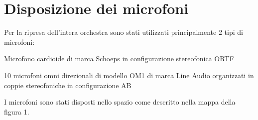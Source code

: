 \newcommand{\mylanguages}{italian} %
\newcommand{\mytitle}{Totalità sonora: il corpo dell'orchestra}
\newcommand{\mysubtitle}{Per ascoltare l'organismo sonoro orchestrale nel suo complesso e nei singoli dettagli}
\newcommand{\authorone}{Giancarlo Bottalico}
\newcommand{\institutione}{Conservatorio di musica "N. Piccinni", Bari}
\newcommand{\emailone}{giancarlobottalico@gmail.com}


\maketitle
\thispagestyle{empty}
\section*{Disposizione dei microfoni}
Per la ripresa dell'intera orchestra sono stati utilizzati principalmente 2 tipi di microfoni:
\begin{compactitem} 
\item Microfono cardioide di marca Schoeps in configurazione stereofonica ORTF
\item 10 microfoni omni direzionali di modello OM1 di marca Line Audio organizzati in coppie stereofoniche in configurazione AB
\end{compactitem}
I microfoni sono stati disposti nello spazio come descritto nella mappa della figura 1.

